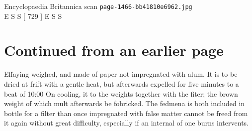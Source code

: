 \documentclass{article}
\begin{document}
\begin{center}
{\Large Encyclopaedia Britannica scan \texttt{page-1466-bb41810e6962.jpg}}\\[0.5em]
E S S [ 729 ] E S S
\end{center}
\section*{Continued from an earlier page}
Effaying weighed, and made of paper not impregnated with alum. It is to be dried at frift with a gentle heat, but afterwards expelled for five minutes to a beat of 10:00 On cooling, it to the weights together with the fiter; the brown weight of which mult afterwards be fobricked. The fedmena is both included in bottle for a filter than once impregnated with false matter cannot be freed from it again without great difficulty, especially if an internal of one burns intervents.
\end{document}
